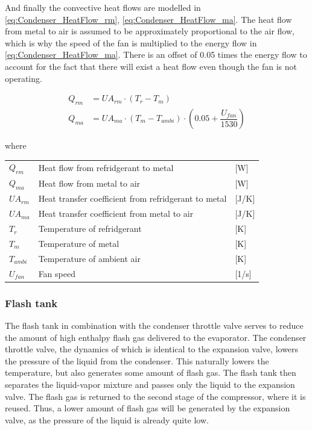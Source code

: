 And finally the convective heat flows are modelled in \cref{eq:Condenser_HeatFlow_rm}, \cref{eq:Condenser_HeatFlow_ma}. The heat flow from metal to air is assumed to be approximately proportional to the air flow, which is why the speed of the fan is multiplied to the energy flow in \cref{eq:Condenser_HeatFlow_ma}. There is an offset of 0.05 times the energy flow to account for the fact that there will exist a heat flow even though the fan is not operating.

\begin{align}
	Q_{rm}	 			& = U A_{rm} \cdot (T_r - T_m)							\label{eq:Condenser_HeatFlow_rm}\\
	Q_{ma}	 			& = U A_{ma} \cdot (T_m - T_{ambi})\cdot (0.05 + \dfrac{U_{fan}}{1530})				\label{eq:Condenser_HeatFlow_ma}
\end{align}

where

\begin{center}
	\begin{tabular}{l p{8cm} l}
		$Q_{rm}$				&	Heat flow from refridgerant to metal					& [\si{W}] \\
		$Q_{ma}$				&	Heat flow from metal to air								& [\si{W}] \\
		$U A_{rm}$				& 	Heat transfer coefficient from refridgerant to metal 	& [\si{J}/\si{K}] \\
		$U A_{ma}$				& 	Heat transfer coefficient from metal to air				& [\si{J}/\si{K}] \\
		$T_r$					& 	Temperature of refridgerant 							& [\si{K}] \\
		$T_m$					&	Temperature of metal 									& [\si{K}] \\
		$T_{ambi}$				&	Temperature of ambient air 								& [\si{K}] \\
		$U_{fan}$				&	Fan speed												& [1/\si{s}] \\
	\end{tabular}
\end{center}



\subsubsection{Flash tank}
The flash tank in combination with the condenser throttle valve serves to reduce the amount of high enthalpy flash gas delivered to the evaporator. The condenser throttle valve, the dynamics of which is identical to the expansion valve, lowers the pressure of the liquid from the condenser. This naturally lowers the temperature, but also generates some amount of flash gas. The flash tank then separates the liquid-vapor mixture and passes only the liquid to the expansion valve. The flash gas is returned to the second stage of the compressor, where it is reused. Thus, a lower amount of flash gas will be generated by the expansion valve, as the pressure of the liquid is already quite low.

